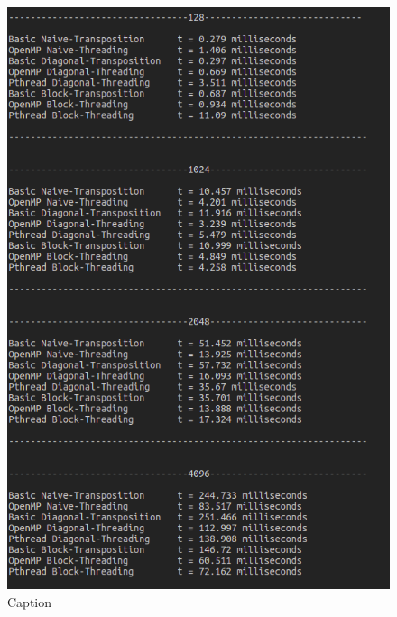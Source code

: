 \documentclass[conference]{IEEEtran}
\begin{document}
\begin{figure}[h!]
    \centering
    \includegraphics[scale = 0.6]{4b.png}
    \caption{Caption}
    \label{fig:my_label}
\end{figure}




\end{document}
